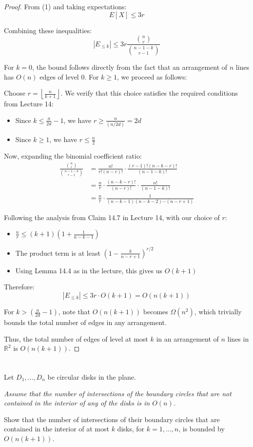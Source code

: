 \documentclass{article}
\begin{document}
\begin{proof}
From (1) and taking expectations:
\[E[X] \leq 3r\]

Combining these inequalities:
\[|E_{\leq k}| \leq 3r\frac{\binom{n}{r}}{\binom{n-1-k}{r-1}}\]

For $k = 0$, the bound follows directly from the fact that an arrangement of $n$ lines has $O(n)$ edges of level 0. For $k \geq 1$, we proceed as follows:

Choose $r = \left\lfloor\frac{n}{k+1}\right\rfloor$. We verify that this choice satisfies the required conditions from Lecture 14:
\begin{itemize}
\item Since $k \leq \frac{n}{2d} - 1$, we have $r \geq \frac{n}{(n/2d)} = 2d$
\item Since $k \geq 1$, we have $r \leq \frac{n}{2}$
\end{itemize}

Now, expanding the binomial coefficient ratio:
\begin{align*}
\frac{\binom{n}{r}}{\binom{n-1-k}{r-1}} &= \frac{n!}{r!(n-r)!} \cdot \frac{(r-1)!(n-k-r)!}{(n-1-k)!} \\
&= \frac{n}{r} \cdot \frac{(n-k-r)!}{(n-r)!} \cdot \frac{n!}{(n-1-k)!} \\
&= \frac{n}{r} \cdot \frac{1}{(n-k-1)(n-k-2)\cdots(n-r+1)}
\end{align*}

Following the analysis from Claim 14.7 in Lecture 14, with our choice of $r$:
\begin{itemize}
\item $\frac{n}{r} \leq (k+1)\left(1 + \frac{1}{n-k-1}\right)$
\item The product term is at least $\left(1 - \frac{k}{n-r+1}\right)^{r/2}$
\item Using Lemma 14.4 as in the lecture, this gives us $O(k+1)$
\end{itemize}

Therefore:
\[|E_{\leq k}| \leq 3r \cdot O(k+1) = O(n(k+1))\]

For $k > \left(\frac{n}{2d} - 1\right)$, note that $O(n(k+1))$ becomes $\Omega(n^2)$, which trivially bounds the total number of edges in any arrangement.

Thus, the total number of edges of level at most $k$ in an arrangement of $n$ lines in $\mathbb{R}^2$ is $O(n(k+1))$.
\end{proof}



  \section{}
  \begin{centerframebox}
    Let \(D_1, \ldots, D_n\) be circular disks in the plane.

    \textit{Assume that the number of intersections of the boundary circles that are not contained in the interior of any of the disks is in \(O(n)\).}
    
    Show that the number of intersections of their boundary circles that are contained in the interior of at most \(k\) disks, for \(k = 1, \ldots, n\), is bounded by \(O(n(k + 1))\).
  \end{centerframebox}
\end{document}
